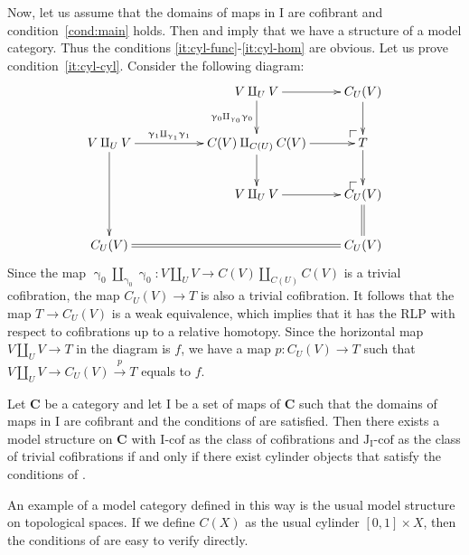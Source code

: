 \documentclass{tac}
\makeatletter
\theoremstyle{definition}
\newcommand{\cat}[1]{\mathbf{#1}}
\newcommand{\C}{\cat{C}}
\newcommand{\I}{\mathrm{I}}
\newcommand{\J}{\mathrm{J}}
\newcommand{\class}[2]{#1\text{-}\mathrm{#2}}
\newcommand{\Icof}[1][\I]{\class{#1}{cof}}
\newcommand{\Jcof}[1][]{\Icof[\J#1]}
\newcommand{\cyli}{\upgamma}
\newcommand{\po}[1][dr]{\save*!/#1+1.2pc/#1:(1,-1)@^{|-}\restore}
\makeatother
\begin{document}
Now, let us assume that the domains of maps in $\I$ are cofibrant and condition~\eqref{cond:main} holds.
Then  and  imply that we have a structure of a model category.
Thus the conditions \eqref{it:cyl-func}-\eqref{it:cyl-hom} are obvious.
Let us prove condition~\eqref{it:cyl-cyl}.
Consider the following diagram:
\[ \xymatrix{                                                                    & & V \amalg_U V \ar[r] \ar[d]_{\cyli_0 \amalg_{\cyli_0} \cyli_0} & C_U(V) \ar[d] \\
                V \amalg_U V \ar[rr]^-{\cyli_1 \amalg_{\cyli_1} \cyli_1} \ar[dd] & & C(V) \amalg_{C(U)} C(V) \ar[d] \ar[r]                         & \po T \ar[d] \\
                                                                                 & & V \amalg_U V \ar[r]                                           & \po C_U(V) \ar@{=}[d] \\
                C_U(V) \ar@{=}[rrr]                                              & &                                                               & C_U(V)
            } \]
Since the map $\cyli_0 \amalg_{\cyli_0} \cyli_0 : V \amalg_U V \to C(V) \amalg_{C(U)} C(V)$ is a trivial cofibration, the map $C_U(V) \to T$ is also a trivial cofibration.
It follows that the map $T \to C_U(V)$ is a weak equivalence, which implies that it has the RLP with respect to cofibrations up to a relative homotopy.
Since the horizontal map $V \amalg_U V \to T$ in the diagram is $f$, we have a map $p : C_U(V) \to T$ such that $V \amalg_U V \to C_U(V) \overset{p}\to T$ equals to $f$.
\endproof

\begin{cor}
Let $\C$ be a category and let $\I$ be a set of maps of $\C$ such that the domains of maps in $\I$ are cofibrant and the conditions of  are satisfied.
Then there exists a model structure on $\C$ with $\Icof$ as the class of cofibrations and $\Jcof[_\I]$ as the class of trivial cofibrations
if and only if there exist cylinder objects that satisfy the conditions of .
\end{cor}

\begin{exmp}
An example of a model category defined in this way is the usual model structure on topological spaces.
If we define $C(X)$ as the usual cylinder $[0,1] \times X$, then the conditions of  are easy to verify directly.
\end{exmp}
\end{document}
